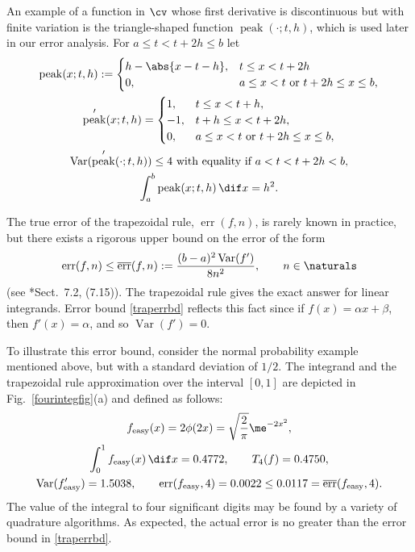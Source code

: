 \documentclass[]{article}
\DeclareMathOperator{\Var}{Var}
\DeclareMathOperator{\err}{err}
\newcommand{\oerr}{\overline{\err}}
\theoremstyle{definition}
\theoremstyle{remark}
\DeclareMathOperator{\tri}{peak}
\begin{document}
An example of a function in $\cv$ whose first derivative is  discontinuous but with finite variation is the triangle-shaped function  $\tri(\cdot;t,h)$, which is used later in our error analysis.  For $a \le t < t+2h \le b$ let 
\begin{subequations} \label{trifundef}
\begin{gather}
\tri(x;t,h):= \begin{cases} h -\abs{x-t-h},  & t \le x < t+2h  \\
0, & a \le x < t \text{ or } t+2h \le x \le b,
\end{cases} \\
\tri'(x;t,h) = \begin{cases} 
1, & t \le x < t+h, \\
-1, & t+h \le x < t+2h, \\
0, & a \le x < t \text{ or } t+2h \le x \le b, 
\end{cases} \\
\label{trifunVar}
\Var(\tri'(\cdot;t,h)) \le 4 \text{ with equality if $a < t  < t+2h < b$}, \\
\label{trifuninteg}
\int_a^b \tri(x;t,h) \, \dif x = h^2.
\end{gather}
\end{subequations}

The true error of the trapezoidal rule, $\err(f,n)$, is rarely known in practice, but there exists a rigorous upper bound on the error of the form 
\begin{equation} \label{traperrbd}
\err(f,n) \le \oerr(f,n):=\frac{(b-a)^2\Var(f')}{8n^2}, \qquad n \in \naturals
\end{equation}
(see *{Sect.\ 7.2, (7.15)}). The trapezoidal rule gives the exact answer for linear integrands.  Error bound \eqref{traperrbd} reflects this fact since if $f(x)=\alpha x+ \beta$, then $f'(x)=\alpha$, and so $\Var(f')=0$.

To illustrate this error bound, consider the normal probability example mentioned above, but with a standard deviation of $1/2$.  The integrand and the trapezoidal rule approximation over the interval $[0,1]$ are depicted in Fig.\ \ref{fourintegfig}(a) and defined as follows:
\begin{subequations} \label{feasy}
\begin{gather}
f_{\text{easy}}(x) = 2\phi(2x) = \sqrt{\frac{2}{\pi}} \me^{-2x^2}, \\
\int_0^1 f_{\text{easy}}(x)  \, \dif x = 0.4772, \qquad T_{4}(f)= 0.4750, \\
\Var(f'_{\text{easy}}) = 1.5038, \qquad \err(f_{\text{easy}},4)=0.0022 \le 0.0117 = \oerr(f_{\text{easy}},4).
\end{gather}
\end{subequations}
The value of the integral to four significant digits may be found by a variety of quadrature algorithms. As expected, the actual error is no greater than the error bound in \eqref{traperrbd}.
\end{document}
